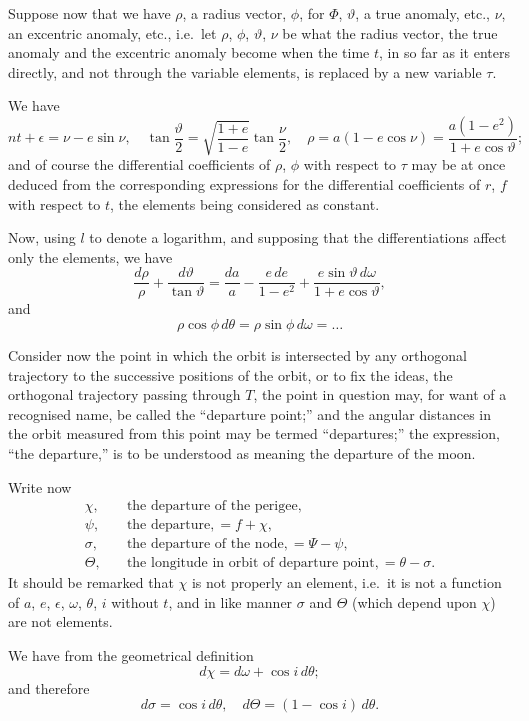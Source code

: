 \documentclass[12pt,a4paper]{article}
\theoremstyle{plain}
\begin{document}
Suppose now that we have $\rho$, a radius vector, $\phi$, for $\Phi$, $\vartheta$, a true anomaly, etc., $\nu$, an excentric anomaly, etc., i.e.\ let $\rho$, $\phi$, $\vartheta$, $\nu$ be what the radius vector, the true anomaly and the excentric anomaly become when the time $t$, in so far as it enters directly, and not through the variable elements, is replaced by a new variable $\tau$.

We have
\[
nt + \epsilon = \nu - e\sin\nu, \quad \tan\frac{\vartheta}{2} = \sqrt{\frac{1+e}{1-e}}\tan\frac{\nu}{2}, \quad \rho = a(1-e\cos\nu) = \frac{a(1-e^2)}{1+e\cos\vartheta};
\]
and of course the differential coefficients of $\rho$, $\phi$ with respect to $\tau$ may be at once deduced from the corresponding expressions for the differential coefficients of $r$, $f$ with respect to $t$, the elements being considered as constant.

Now, using $l$ to denote a logarithm, and supposing that the differentiations affect only the elements, we have
\[
\frac{d\rho}{\rho} + \frac{d\vartheta}{\tan\vartheta} = \frac{da}{a} - \frac{e\, de}{1-e^2} + \frac{e\sin\vartheta\, d\omega}{1+e\cos\vartheta},
\]
and
\[
\rho\cos\phi\, d\theta = \rho\sin\phi\, d\omega = \ldots
\]

Consider now the point in which the orbit is intersected by any orthogonal trajectory to the successive positions of the orbit, or to fix the ideas, the orthogonal trajectory passing through $T$, the point in question may, for want of a recognised name, be called the ``departure point;'' and the angular distances in the orbit measured from this point may be termed ``departures;'' the expression, ``the departure,'' is to be understood as meaning the departure of the moon.

Write now
\begin{align*}
\chi, \quad &\text{the departure of the perigee}, \\
\psi, \quad &\text{the departure}, = f + \chi, \\
\sigma, \quad &\text{the departure of the node}, = \Psi - \psi, \\
\Theta, \quad &\text{the longitude in orbit of departure point}, = \theta - \sigma.
\end{align*}
It should be remarked that $\chi$ is not properly an element, i.e.\ it is not a function of $a$, $e$, $\epsilon$, $\omega$, $\theta$, $i$ without $t$, and in like manner $\sigma$ and $\Theta$ (which depend upon $\chi$) are not elements.

We have from the geometrical definition
\[
d\chi = d\omega + \cos i\, d\theta;
\]
and therefore
\[
d\sigma = \cos i\, d\theta, \quad d\Theta = (1-\cos i)\, d\theta.
\]
\end{document}
